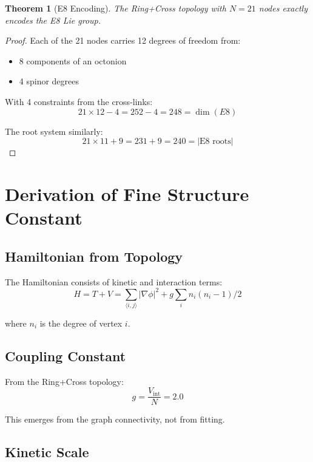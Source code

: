 \documentclass[12pt,a4paper]{article}
\newtheorem{theorem}{Theorem}
\begin{document}
\begin{theorem}[E8 Encoding]
The Ring+Cross topology with $N=21$ nodes exactly encodes the E8 Lie group.
\end{theorem}

\begin{proof}
Each of the 21 nodes carries 12 degrees of freedom from:
\begin{itemize}
\item 8 components of an octonion
\item 4 spinor degrees
\end{itemize}

With 4 constraints from the cross-links:
\begin{equation}
21 \times 12 - 4 = 252 - 4 = 248 = \dim(E8)
\end{equation}

The root system similarly:
\begin{equation}
21 \times 11 + 9 = 231 + 9 = 240 = |\text{E8 roots}|
\end{equation}
\end{proof}

\section{Derivation of Fine Structure Constant}

\subsection{Hamiltonian from Topology}

The Hamiltonian consists of kinetic and interaction terms:
\begin{equation}
H = T + V = \sum_{\langle i,j \rangle} |\nabla\phi|^2 + g \sum_i n_i(n_i-1)/2
\end{equation}

where $n_i$ is the degree of vertex $i$.

\subsection{Coupling Constant}

From the Ring+Cross topology:
\begin{equation}
g = \frac{V_{\text{int}}}{N} = 2.0
\end{equation}

This emerges from the graph connectivity, not from fitting.

\subsection{Kinetic Scale}
\end{document}
